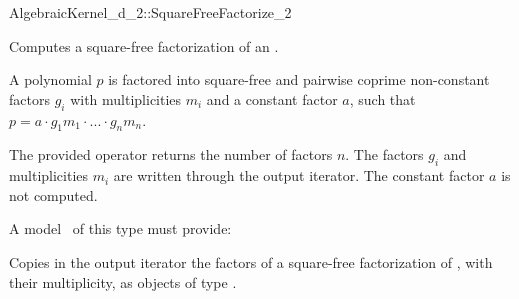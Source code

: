 \begin{ccRefConcept}{AlgebraicKernel_d_2::SquareFreeFactorize_2}

\ccDefinition
Computes a square-free factorization of an
.

A polynomial $p$ is factored into square-free and pairwise 
coprime non-constant factors $g_i$ with multiplicities $m_i$ 
and a constant factor $a$, such that 
$p = a  \cdot  g_1m_1  \cdot  ...  \cdot  g_nm_n$.

The provided operator returns the number of factors $n$.
The factors $g_i$ and multiplicities $m_i$ are written through the 
output iterator. 
The constant factor $a$ is not computed. 

\ccRefines 
{} 

\ccOperations
{}

A model \ccVar\ of this type must provide:

{Copies in the output iterator the factors of a square-free 
factorization of , with their multiplicity, as objects of type 
.}

\ccSeeAlso

\end{ccRefConcept}
